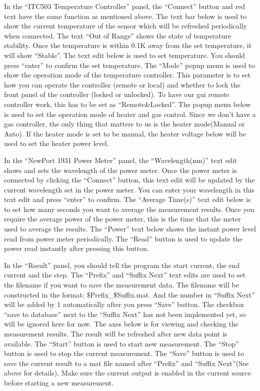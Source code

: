 \documentclass[a4paper,12pt]{article}
\begin{document}
In the ``ITC503 Temperature Controller'' panel, the ``Connect'' button and red text
have the same function as mentioned above. The text bar below is used to show
the current temperature of the sensor which will be refreshed periodically when
connected. The text ``Out of Range'' shows the state of temperature stability.
Once the temperature is within 0.1K away from the set temperature, it will show
``Stable''. The text edit below is used to set temperature. You should press
``enter'' to confirm the set temperature. The ``Mode'' popup menu is used to show
the operation mode of the temperature controller. This parameter is to set how
you can operate the controller (remote or local) and whether to lock the front
panel of the controller (locked or unlocked). To have our gui remote controller
work, this has to be set as ``Remote\&Locked''. The popup menu below is used to
set the operation mode of heater and gas control. Since we don't have a gas
controller, the only thing that matters to us is the heater mode(Manual or
Auto). If the heater mode is set to be manual, the heater voltage below will be
used to set the heater power level. 

In the ``NewPort 1931 Power Meter'' panel, the ``Wavelength(nm)'' text edit shows
and sets the wavelength of the power meter. Once the power meter is connected by
clicking the ``Connect'' button, this text edit will be updated by the current
wavelength set in the power meter. You can enter your wavelength in this text
edit and press ``enter'' to confirm. The ``Average Time(s)'' text edit below is to
set how many seconds you want to average the measurement results. Once you
require the average power of the power meter, this is the time that the meter
used to average the results. The ``Power'' text below shows the instant power
level read from power meter periodically. The ``Read'' button is used to update
the power read instantly after pressing this button. 

In the ``Result'' panel, you should tell the program the start current, the end
current and the step. The ``Prefix'' and ``Suffix Next'' text edits are used to set
the filename if you want to save the measurement data. The filename will be
constructed in the format: \$Prefix\_\$Suffix.mat. And the number in ``Suffix
Next'' will be added by 1 automatically after you press ``Save'' button. The
checkbox ``save to database'' next to the ``Suffix Next'' has not been implemented
yet, so will be ignored here for now. The axes below is for viewing and checking
the measurement results. The result will be refreshed after new data point is
available. The ``Start'' button is used to start new measurement. The ``Stop''
button is used to stop the current measurement. The ``Save'' button is used to
save the current result to a mat file named after ``Prefix'' and ``Suffix Next''(See
above for details). Make sure the current output is enabled in the current
source before starting a new measurement.
\end{document}
